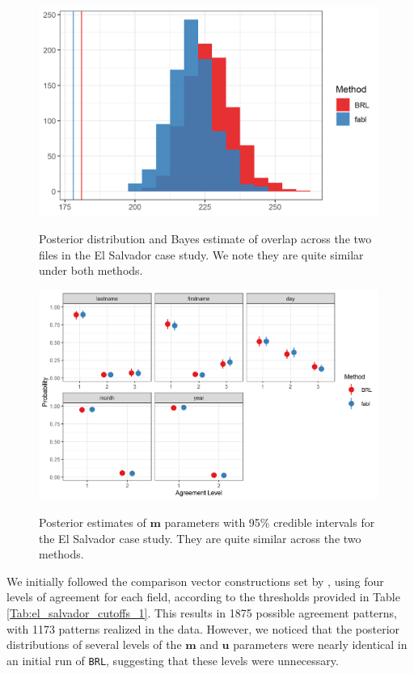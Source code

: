 \documentclass[ba]{imsart}
\begin{document}
	\begin{figure}[p]
	\begin{center}
		\includegraphics[width=0.99\textwidth]{../notes/figures/el_salvador/overlap_distribution_smallP_bayes}
		\caption{Posterior distribution and Bayes estimate of overlap across the two files in the El Salvador case study. We note they are quite similar under both methods.}
		\label{fig:overlap-plot}
	\end{center}

	\begin{center}
		\includegraphics[width=0.99\textwidth]{../notes/figures/el_salvador/m_posterior_smallP} 
		\caption{Posterior estimates of $\bm{m}$ parameters with 95\% credible intervals for the El Salvador case study. They are quite similar across the two methods.}\label{fig:m-and-u}
		\label{fig:m-and-u}
	\end{center}
\end{figure}
	
	We initially followed the comparison vector constructions set by \cite{sadinle_bayesian_2017}, using four levels of agreement for each field, according to the thresholds provided in Table \ref{Tab:el_salvador_cutoffs_1}. This results in 1875 possible agreement patterns, with 1173 patterns realized in the data. However, we noticed that the posterior distributions of several levels of the $\bm{m}$ and $\bm{u}$ parameters were nearly identical in an initial run of \texttt{BRL}, suggesting that these levels were unnecessary.
	
\end{document}
